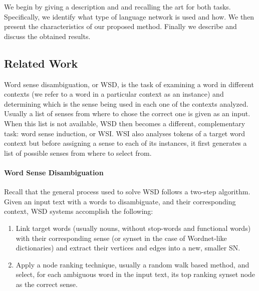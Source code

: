 We begin by giving a description and and recalling the art for both tasks. Specifically, we identify what type of language network is used and how.
We then present the characteristics of our proposed method. Finally we describe and discuss the obtained results.

\subsection{Related Work}

Word sense disambiguation, or WSD, is the task of examining a word in different contexts (we refer to a word in a particular context as an instance)  and determining which is the sense being used in each one of the contexts analyzed. Usually a list of senses from where to chose the correct one is given as an input. When this list is not available, WSD then becomes a different, complementary task: word sense induction, or WSI. WSI also analyses  tokens of a target word context but before assigning a sense to each of its instances, it first generates a list of possible senses from where to select from. 

\paragraph{Word Sense Disambiguation}

Recall that the general process used to solve WSD follows a two-step algorithm. Given an input text with a words to disambiguate, and their corresponding context, WSD systems accomplish the following:
\begin{enumerate}
\item Link target words (usually nouns, without stop-words and functional words) with their corresponding  sense (or synset in the case of Wordnet-like dictionaries) and extract their vertices and edges into a new, smaller SN. 
\item Apply a node ranking technique, usually a random walk based method, and select, for each ambiguous word in the input text,  its top ranking synset node as the correct sense.
\end{enumerate}


